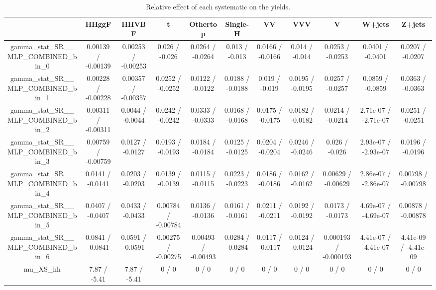 \documentclass[10pt]{article}
\begin{document}
\begin{table}[htbp]
\begin{center}
\begin{tabular}{|c|c|c|c|c|c|c|c|c|c|c|}
\hline 
      & HHggF      & HHVBF      & t      & Othertop      & Single-H      & VV      & VVV      & V      & W+jets      & Z+jets \\ 
\hline 
  gamma_stat_SR__MLP_COMBINED_bin_0 & 0.00139 / -0.00139 & 0.00253 / -0.00253 & 0.026 / -0.026 & 0.0264 / -0.0264 & 0.013 / -0.013 & 0.0166 / -0.0166 & 0.014 / -0.014 & 0.0253 / -0.0253 & 0.0401 / -0.0401 & 0.0207 / -0.0207 \\ 
  gamma_stat_SR__MLP_COMBINED_bin_1 & 0.00228 / -0.00228 & 0.00357 / -0.00357 & 0.0252 / -0.0252 & 0.0122 / -0.0122 & 0.0188 / -0.0188 & 0.019 / -0.019 & 0.0195 / -0.0195 & 0.0257 / -0.0257 & 0.0859 / -0.0859 & 0.0363 / -0.0363 \\ 
  gamma_stat_SR__MLP_COMBINED_bin_2 & 0.00311 / -0.00311 & 0.0044 / -0.0044 & 0.0242 / -0.0242 & 0.0333 / -0.0333 & 0.0168 / -0.0168 & 0.0175 / -0.0175 & 0.0182 / -0.0182 & 0.0214 / -0.0214 & 2.71e-07 / -2.71e-07 & 0.0251 / -0.0251 \\ 
  gamma_stat_SR__MLP_COMBINED_bin_3 & 0.00759 / -0.00759 & 0.0127 / -0.0127 & 0.0193 / -0.0193 & 0.0184 / -0.0184 & 0.0125 / -0.0125 & 0.0204 / -0.0204 & 0.0246 / -0.0246 & 0.026 / -0.026 & 2.93e-07 / -2.93e-07 & 0.0196 / -0.0196 \\ 
  gamma_stat_SR__MLP_COMBINED_bin_4 & 0.0141 / -0.0141 & 0.0203 / -0.0203 & 0.0139 / -0.0139 & 0.0115 / -0.0115 & 0.0223 / -0.0223 & 0.0186 / -0.0186 & 0.0162 / -0.0162 & 0.00629 / -0.00629 & 2.86e-07 / -2.86e-07 & 0.00798 / -0.00798 \\ 
  gamma_stat_SR__MLP_COMBINED_bin_5 & 0.0407 / -0.0407 & 0.0433 / -0.0433 & 0.00784 / -0.00784 & 0.0136 / -0.0136 & 0.0161 / -0.0161 & 0.0211 / -0.0211 & 0.0192 / -0.0192 & 0.0173 / -0.0173 & 4.69e-07 / -4.69e-07 & 0.00878 / -0.00878 \\ 
  gamma_stat_SR__MLP_COMBINED_bin_6 & 0.0841 / -0.0841 & 0.0591 / -0.0591 & 0.00275 / -0.00275 & 0.00493 / -0.00493 & 0.0284 / -0.0284 & 0.0117 / -0.0117 & 0.0124 / -0.0124 & 0.000193 / -0.000193 & 4.41e-07 / -4.41e-07 & 4.41e-09 / -4.41e-09 \\ 
  mu_XS_hh & 7.87 / -5.41 & 7.87 / -5.41 & 0 / 0 & 0 / 0 & 0 / 0 & 0 / 0 & 0 / 0 & 0 / 0 & 0 / 0 & 0 / 0 \\ 
\hline 
\end{tabular} 
\caption{Relative effect of each systematic on the yields.} 
\end{center} 
\end{table} 
\end{document}
